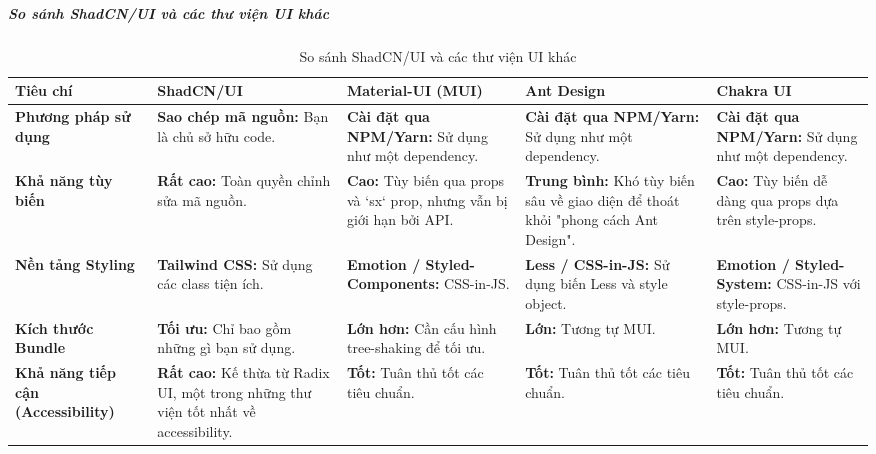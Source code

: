 \subparagraph{So sánh ShadCN/UI và các thư viện UI khác}
\clearpage
\begin{landscape}
\begin{table}[h!]
\centering
\setlength{\tabcolsep}{4pt} 
\footnotesize 
\begin{tabularx}{\linewidth}{|l|X|X|X|X|}
\hline
\textbf{Tiêu chí} & \textbf{ShadCN/UI} & \textbf{Material-UI (MUI)} & \textbf{Ant Design} & \textbf{Chakra UI} \\
\hline
\textbf{Phương pháp sử dụng} & \textbf{Sao chép mã nguồn:} Bạn là chủ sở hữu code. & \textbf{Cài đặt qua NPM/Yarn:} Sử dụng như một dependency. & \textbf{Cài đặt qua NPM/Yarn:} Sử dụng như một dependency. & \textbf{Cài đặt qua NPM/Yarn:} Sử dụng như một dependency. \\
\hline
\textbf{Khả năng tùy biến} & \textbf{Rất cao:} Toàn quyền chỉnh sửa mã nguồn. & \textbf{Cao:} Tùy biến qua props và `sx` prop, nhưng vẫn bị giới hạn bởi API. & \textbf{Trung bình:} Khó tùy biến sâu về giao diện để thoát khỏi "phong cách Ant Design". & \textbf{Cao:} Tùy biến dễ dàng qua props dựa trên style-props. \\
\hline
\textbf{Nền tảng Styling} & \textbf{Tailwind CSS:} Sử dụng các class tiện ích. & \textbf{Emotion / Styled-Components:} CSS-in-JS. & \textbf{Less / CSS-in-JS:} Sử dụng biến Less và style object. & \textbf{Emotion / Styled-System:} CSS-in-JS với style-props. \\
\hline
\textbf{Kích thước Bundle} & \textbf{Tối ưu:} Chỉ bao gồm những gì bạn sử dụng. & \textbf{Lớn hơn:} Cần cấu hình tree-shaking để tối ưu. & \textbf{Lớn:} Tương tự MUI. & \textbf{Lớn hơn:} Tương tự MUI. \\
\hline
\textbf{Khả năng tiếp cận (Accessibility)} & \textbf{Rất cao:} Kế thừa từ Radix UI, một trong những thư viện tốt nhất về accessibility. & \textbf{Tốt:} Tuân thủ tốt các tiêu chuẩn. & \textbf{Tốt:} Tuân thủ tốt các tiêu chuẩn. & \textbf{Tốt:} Tuân thủ tốt các tiêu chuẩn. \\
\hline
\end{tabularx}
\caption{So sánh ShadCN/UI và các thư viện UI khác}
\end{table}
\end{landscape}
